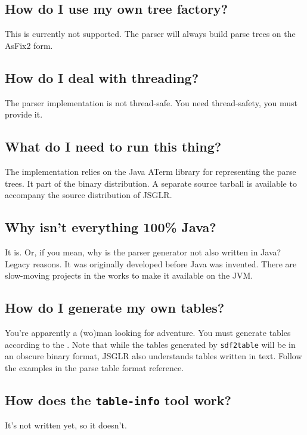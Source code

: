 \documentclass{article}
\newcommand{\cc}[1]{\texttt{#1}}
\begin{document}
\subsection{How do I use my own tree factory?}

	This is currently not supported. The parser will always build parse trees on
	the AsFix2 form. 
	
\subsection{How do I deal with threading?}

	The parser implementation is not thread-safe. You need thread-safety, you
	must provide it.

\subsection{What do I need to run this thing?}

	The implementation relies on the Java ATerm library for representing the parse
	trees. It part of the binary distribution. A separate source tarball is
	available to accompany the source distribution of JSGLR. 
	
\subsection{Why isn't everything 100\% Java?}

	It is. Or, if you mean, why is the parser generator not also written in Java?
	Legacy reasons. It was originally developed before Java was invented. There
	are slow-moving projects in the works to make it available on the JVM.
	
\subsection{How do I generate my own tables?}
	 
	You're apparently a (wo)man looking for adventure. You must generate tables
	according to the . Note
	that while the tables generated by \cc{sdf2table} will be in an obscure binary
	format, JSGLR also understands tables written in text. Follow the examples in
	the parse table format reference.
	
\subsection{How does the \cc{table-info} tool work?}

	It's not written yet, so it doesn't.
\end{document}
